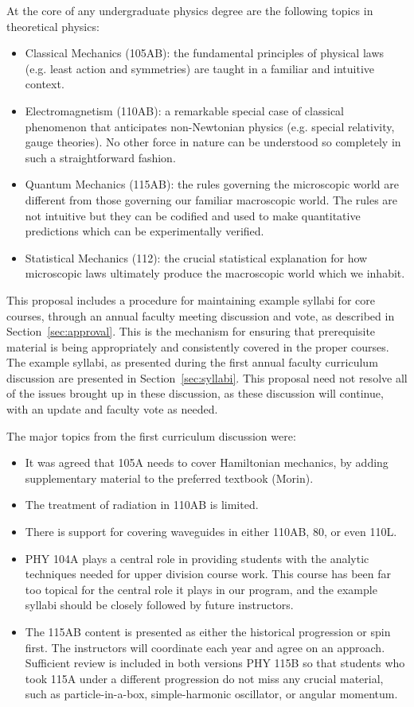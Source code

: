 \documentclass[12pt]{article}
\begin{document}
At the core of any undergraduate physics degree are the following
topics in theoretical physics:
\begin{itemize}
\item Classical Mechanics (105AB): the fundamental principles of physical laws
  (e.g. least action and symmetries) are taught in a familiar and
  intuitive context. 
\item Electromagnetism (110AB): a remarkable special case of classical
  phenomenon that anticipates non-Newtonian physics (e.g. special
  relativity, gauge theories).  No other force in nature can be understood so
  completely in such a straightforward fashion.  
\item Quantum Mechanics (115AB): the rules governing the microscopic world are
  different from those governing our familiar macroscopic world.  The
  rules are not intuitive but they can be codified and used to make
  quantitative predictions which can be experimentally verified.
\item Statistical Mechanics (112): the crucial statistical explanation for how
  microscopic laws ultimately produce the macroscopic world which we inhabit.
\end{itemize}

This proposal includes a procedure for maintaining example syllabi for
core courses, through an annual faculty meeting discussion and vote,
as described in Section~\ref{sec:approval}.  This is the mechanism for
ensuring that prerequisite material is being appropriately and
consistently covered in the proper courses.  The example syllabi, as
presented during the first annual faculty curriculum discussion are
presented in Section~\ref{sec:syllabi}.  This proposal need not
resolve all of the issues brought up in these discussion, as these
discussion will continue, with an update and faculty vote as
needed.

The major topics from the first curriculum discussion were:
\begin{itemize}
 \item It was agreed that 105A needs to cover Hamiltonian mechanics, by
   adding supplementary material to the preferred textbook (Morin).
 \item The treatment of radiation in 110AB is limited.
 \item There is support for covering waveguides in either 110AB, 80, or even 110L.   
 \item PHY 104A plays a central role in providing students with the
   analytic techniques needed for upper division course work.  This
   course has been far too topical for the central role it plays in
   our program, and the example syllabi should be closely followed by
   future instructors.
 \item The 115AB content is presented as either the historical
   progression or spin first.  The instructors will coordinate each
   year and agree on an approach.  Sufficient review is included in
   both versions PHY 115B so that students who took 115A under a
   different progression do not miss any crucial material, such as
   particle-in-a-box, simple-harmonic oscillator, or angular momentum.

   
\end{itemize}
\end{document}
